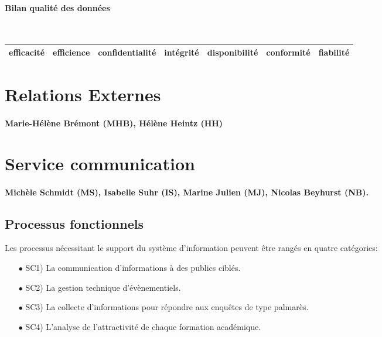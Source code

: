 \documentclass{book}
\begin{document}
\paragraph{Bilan qualité des données}
~\\


	\begin{tabular}{|l|l|l|l|l|l|l|}
	\hline
	efficacité	& efficience &	confidentialité	& intégrité & disponibilité & conformité & fiabilité \\
	\hline
	
	\hline
	\end{tabular}
	



\section{Relations Externes}
\paragraph{Marie-Hélène Brémont (MHB), Hélène Heintz (HH)}

\section{Service communication}

\paragraph{Michèle Schmidt (MS), Isabelle Suhr (IS), Marine Julien (MJ), 
Nicolas Beyhurst (NB).}

\subsection{Processus fonctionnels}
Les processus nécessitant le support du système d'information peuvent 
être rangés en quatre catégories:
\begin{itemize}
\item[$\bullet$] SC1) La communication d'informations à des publics ciblés.
\item[$\bullet$] SC2) La gestion technique d'évènementiels.
\item[$\bullet$] SC3) La collecte d'informations pour répondre aux enquêtes de type 
      palmarès.
\item[$\bullet$] SC4) L'analyse de l'attractivité de chaque formation académique.
\end{itemize}
\bigskip
\end{document}
